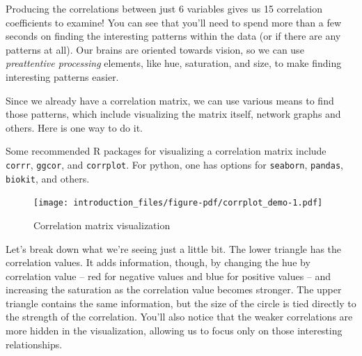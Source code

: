\documentclass[
  letterpaper,
]{krantz}
\begin{document}
Producing the correlations between just 6 variables gives us 15
correlation coefficients to examine! You can see that you'll need to
spend more than a few seconds on finding the interesting patterns within
the data (or if there are any patterns at all). Our brains are oriented
towards vision, so we can use \emph{preattentive processing} elements,
like hue, saturation, and size, to make finding interesting patterns
easier.

Since we already have a correlation matrix, we can use various means to
find those patterns, which include visualizing the matrix itself,
network graphs and others. Here is one way to do it.

\begin{tcolorbox}[enhanced jigsaw, toprule=.15mm, arc=.35mm, rightrule=.15mm, bottomrule=.15mm, leftrule=.75mm, breakable, colframe=quarto-callout-note-color-frame, colback=white, left=2mm, opacityback=0]
\begin{minipage}[t]{5.5mm}
\textcolor{quarto-callout-note-color}{\faInfo}
\end{minipage}%
\begin{minipage}[t]{\textwidth - 5.5mm}

Some recommended R packages for visualizing a correlation matrix include
\texttt{corrr}, \texttt{ggcor}, and \texttt{corrplot}. For python, one
has options for \texttt{seaborn}, \texttt{pandas}, \texttt{biokit}, and
others.

\end{minipage}%
\end{tcolorbox}

\begin{figure}

{\centering \texttt{[image: introduction\_files/figure-pdf/corrplot\_demo-1.pdf]}

}

\caption{Correlation matrix visualization}

\end{figure}

Let's break down what we're seeing just a little bit. The lower triangle
has the correlation values. It adds information, though, by changing the
hue by correlation value -- red for negative values and blue for
positive values -- and increasing the saturation as the correlation
value becomes stronger. The upper triangle contains the same
information, but the size of the circle is tied directly to the strength
of the correlation. You'll also notice that the weaker correlations are
more hidden in the visualization, allowing us to focus only on those
interesting relationships.
\end{document}
